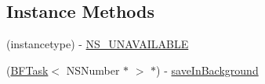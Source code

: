 \subsection*{Instance Methods}
\begin{DoxyCompactItemize}
\item 
(instancetype) -\/ \hyperlink{interface_p_f_file_a36488794cc902f598d88bcc87e06fc57}{N\+S\+\_\+\+U\+N\+A\+V\+A\+I\+L\+A\+B\+L\+E}
\begin{DoxyCompactList}\small\item\em 

 \end{DoxyCompactList}\item 
(\hyperlink{class_b_f_task}{B\+F\+Task}$<$ N\+S\+Number $\ast$ $>$ $\ast$) -\/ \hyperlink{interface_p_f_file_a3c3bce23b7577af0694d2ca9ed761435}{save\+In\+Background}
\begin{DoxyCompactList}\small\item\em 


\end{DoxyCompactList}
\end{DoxyCompactItemize}

